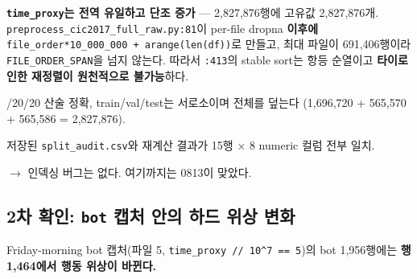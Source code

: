 \par\noindent \textbullet\enspace \textbf{\texttt{time\_\allowbreak{}\allowbreak{}pro\allowbreak{}xy}는 전역 유일하고 단조 증가} — 2,827,876행에 고유값 2,827,876개. \texttt{preproce\allowbreak{}ss\_\allowbreak{}\allowbreak{}cic20\allowbreak{}17\_\allowbreak{}\allowbreak{}full\_\allowbreak{}\allowbreak{}raw.\allowbreak{}py:8\allowbreak{}1}이 per-file dropna \textbf{이후에} \texttt{file\_\allowbreak{}\allowbreak{}ord\allowbreak{}er*10\_\allowbreak{}\allowbreak{}00\allowbreak{}0\_\allowbreak{}\allowbreak{}000 +\allowbreak{}\allowbreak{} \allowbreak{}arange(l\allowbreak{}en(df))}로 만들고, 최대 파일이 691,406행이라 \texttt{FILE\_\allowbreak{}\allowbreak{}ORD\allowbreak{}ER\_\allowbreak{}\allowbreak{}SPAN}을 넘지 않는다. 따라서 \texttt{:413}의 stable sort는 항등 순열이고 \textbf{타이로 인한 재정렬이 원천적으로 불가능}하다.


\par\noindent \textbullet{}/\allowbreak{}20/\allowbreak{}20 산술 정확, train/\allowbreak{}val/\allowbreak{}test는 서로소이며 전체를 덮는다 (1,696,720 +\allowbreak{} 565,570 +\allowbreak{} 565,586 =\allowbreak{} 2,827,876).


\par\noindent \textbullet\enspace 저장된 \texttt{split\_\allowbreak{}\allowbreak{}au\allowbreak{}dit.\allowbreak{}csv}와 재계산 결과가 15행 × 8 numeric 컬럼 전부 일치.


 \ensuremath{\rightarrow}  인덱싱 버그는 없다. 여기까지는 0813이 맞았다.

\subsection{2차 확인: \texttt{bot} 캡처 안의 하드 위상 변화}
Friday-morning bot 캡처(파일 5, \texttt{time\_\allowbreak{}\allowbreak{}pro\allowbreak{}xy /\allowbreak{}\allowbreak{}/\allowbreak{}\allowbreak{} 10\allowbreak{}\textasciicircum{}7 =\allowbreak{}\allowbreak{}=\allowbreak{}\allowbreak{} 5})의 bot 1,956행에는 \textbf{행 1,464에서 행동 위상이 바뀐다.}

